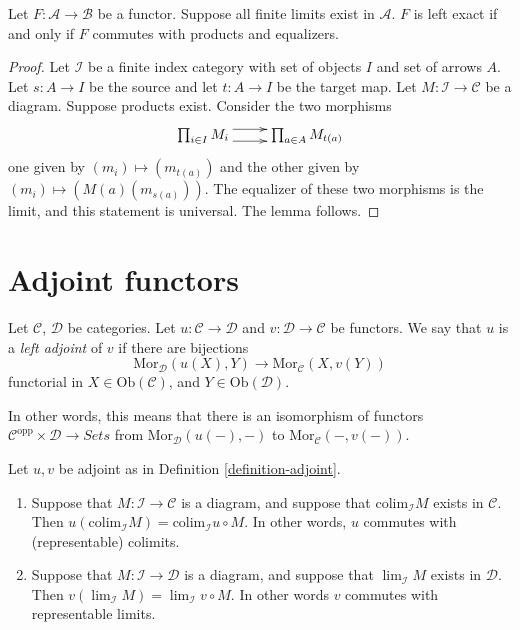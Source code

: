 \begin{lemma}
\label{lemma-characterize-left-exact}
Let $F : \mathcal{A} \to \mathcal{B}$ be a functor.
Suppose all finite limits exist in $\mathcal{A}$.
$F$ is left exact if and only if $F$ commutes with
products and equalizers.
\end{lemma}

\begin{proof}
Let $\mathcal{I}$ be a finite index category with
set of objects $I$ and set of arrows $A$. Let
$s : A  \to I$ be the source and let $t : A \to I$
be the target map. Let $M : \mathcal{I} \to \mathcal{C}$
be a diagram. Suppose products exist. Consider
the two morphisms
$$
\xymatrix{
\prod\nolimits_{i\in I} M_i
\ar@<1ex>[r] \ar@<-1ex>[r]
&
\prod\nolimits_{a\in A} M_{t(a)}
}
$$
one given by $(m_i) \mapsto (m_{t(a)})$
and the other given by $(m_i) \mapsto (M(a)(m_{s(a)}))$.
The equalizer of these two morphisms is the limit,
and this statement is universal. The lemma follows.
\end{proof}


\section{Adjoint functors}
\label{section-adjoint}

\begin{definition}
\label{definition-adjoint}
Let $\mathcal{C}$, $\mathcal{D}$ be categories.
Let $u : \mathcal{C} \to \mathcal{D}$ and
$v : \mathcal{D} \to \mathcal{C}$ be functors.
We say that $u$ is a {\it left adjoint} of $v$
if there are bijections
$$
\text{Mor}_{\mathcal{D}}(u(X), Y)
\longrightarrow
\text{Mor}_{\mathcal{C}}(X, v(Y))
$$
functorial in $X \in \text{Ob}(\mathcal{C})$, and
$Y \in \text{Ob}(\mathcal{D})$.
\end{definition}

\noindent
In other words, this means that there is an isomorphism
of functors $\mathcal{C}^{\text{opp}} \times \mathcal{D}
\to \textit{Sets}$ from $\text{Mor}_{\mathcal{D}}(u(-), -)$
to $\text{Mor}_{\mathcal{C}}(-, v(-))$.

\begin{lemma}
\label{lemma-adjoint-exact}
Let $u,v$ be adjoint as in Definition \ref{definition-adjoint}.
\begin{enumerate}
\item Suppose that $M : \mathcal{I} \to \mathcal{C}$ is a diagram,
and suppose that $\text{colim}_{\mathcal{I}} M$ exists in
$\mathcal{C}$. Then $u(\text{colim}_{\mathcal{I}} M) =
\text{colim}_{\mathcal{I}} u \circ M$. In other words,
$u$ commutes with (representable) colimits.
\item Suppose that $M : \mathcal{I} \to \mathcal{D}$ is a diagram,
and suppose that $\lim_{\mathcal{I}} M$ exists in
$\mathcal{D}$. Then $v(\lim_{\mathcal{I}} M) =
\lim_{\mathcal{I}} v \circ M$. In other words $v$ commutes
with representable limits.
\end{enumerate}
\end{lemma}


